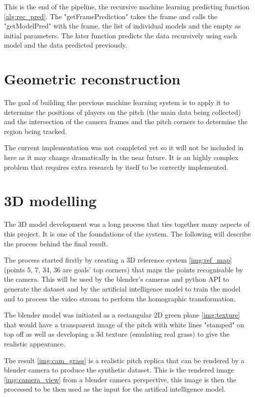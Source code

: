 \documentclass[
    11pt,
    oneside
]{report}
\begin{document}
This is the end of the pipeline, the recursive machine learning predicting function \ref{alg:rec_pred}. The "getFramePrediction" takes the frame and calls the "getModelPred" with the frame, the list of individual models and the empty as initial parameters. The later function predicts the data recursively using each model and the data predicted previously.


\section{Geometric reconstruction}

The goal of building the previous machine learning system is to apply it to determine the positions of players on the pitch (the main data being collected) and the intersection of the camera frames and the pitch corners to determine the region being tracked.


The current implementation was not completed yet so it will not be included in here as it may change dramatically in the near future. It is an highly complex problem that requires extra research by itself to be correctly implemented.




\section{3D modelling}


The 3D model development was a long process that ties together many aspects of this project. It is one of the foundations of the system. The following will describe the process behind the final result.


The process started firstly by creating a 3D reference system \ref{img:ref_map} (points 5, 7, 34, 36 are goals' top corners) that maps the points recognisable by the camera. This will be used by the blender's cameras and python API to generate the dataset and by the artificial intelligence model to train the model and to process the video stream to perform the homographic transformation.



The blender model was initiated as a rectangular 2D green plane \ref{img:texture} that would have a transparent image of the pitch with white lines "stamped" on top off as well as developing a 3d texture (emulating real grass) to give the realistic appearance.



The result \ref{img:cam_grass} is a realistic pitch replica that can be rendered by a blender camera to produce the synthetic dataset. This is the rendered image \ref{img:camera_view} from a blender camera perspective, this image is then the processed to be then used as the input for the artifical intelligence model.
\end{document}
